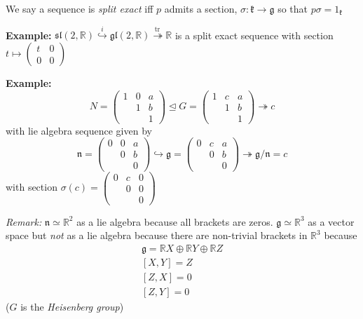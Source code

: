 \documentclass[12pt]{article}
\newcommand{\R}{\mathbb{R}}
\newcommand{\tr}{\text{tr}\,}
\newcommand{\g}{\mathfrak{g}}
\renewcommand{\sl}{\mathfrak{sl}}
\newcommand{\gl}{\mathfrak{gl}}
\begin{document}
    We say a sequence is \emph{split exact} iff $p$ admits a section, $\sigma: \mathfrak{k} \to \g$ so that $p\sigma = 1_{\mathfrak{k}}$  

    \textbf{Example:} $\sl(2, \R) \overset{i}{\hookrightarrow} \gl(2, \R) \overset{\tr}{\twoheadrightarrow} \R$ is a split exact sequence with section $t \mapsto \begin{pmatrix}
        t & 0\\ 
        0 & 0
    \end{pmatrix}$ 

    \textbf{Example:} 
    \[N = \begin{pmatrix}
        1 & 0 & a\\ 
        & 1 & b\\ 
        & & 1
    \end{pmatrix} \trianglelefteq G = \begin{pmatrix}
        1 & c & a\\ 
        & 1 & b\\ 
        & & 1
    \end{pmatrix} \twoheadrightarrow c\] 
    with lie algebra sequence given by 
    \[\mathfrak{n} = \begin{pmatrix}
        0 & 0 & a\\ 
        & 0 & b\\ 
        & & 0
    \end{pmatrix} \hookrightarrow \g = \begin{pmatrix}
        0 & c & a\\ 
        & 0 & b\\ 
        & & 0
    \end{pmatrix} \twoheadrightarrow \g/\mathfrak{n} = c\] 
    with section $\sigma(c) = \begin{pmatrix}
        0 & c & 0\\ 
        & 0 & 0\\ 
        & & 0
    \end{pmatrix}$  
    
    \emph{Remark:} $\mathfrak{n} \simeq \R^2$ as a lie algebra because all brackets are zeros. $\mathfrak{g} \simeq \R^3$ as a vector space but \emph{not} as a lie algebra because there are non-trivial brackets in $\R^3$ because 
    \begin{gather*}
        \g = \R X \oplus \R Y \oplus \R Z\\ 
        [X, Y] = Z\\
        [Z, X] = 0\\ 
        [Z, Y] = 0
    \end{gather*}
    ($G$ is the \emph{Heisenberg group}) 
\end{document}
